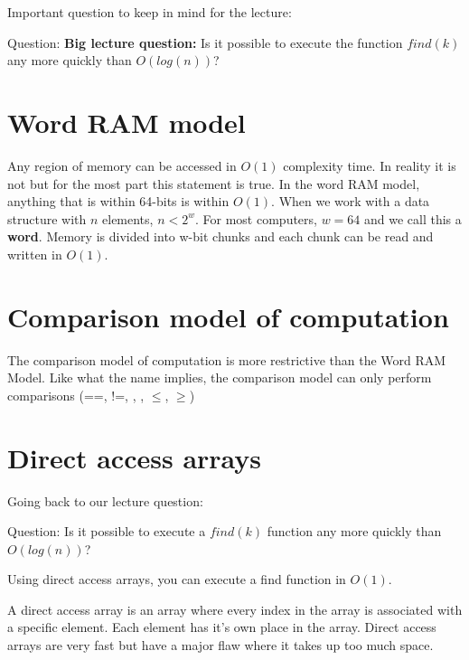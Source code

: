 \documentclass[11pt,a4paper,english]{report}
\begin{document}
Important question to keep in mind for the lecture:
\noindent 

\bigskip
\begin{gbox}{Question:}{
\noindent \textbf{Big lecture question:} Is it possible to execute the function $find(k)$ any more quickly than $O(log(n))$?
}\end{gbox}

\section{Word RAM model}

Any region of memory can be accessed in $O(1)$ complexity time. In reality it is not but for the most part this statement is true. In the word RAM model, anything that is within 64-bits is within $O(1)$. When we work with a data structure with $n$ elements, $n < 2^{w}$. For most computers, $w = 64$ and we call this a \textbf{word}. Memory is divided into w-bit chunks and each chunk can be read and written in $O(1)$.

\section{Comparison model of computation}

The comparison model of computation is more restrictive than the Word RAM Model. Like what the name implies, the comparison model can only perform comparisons (==, !=, , , $\leq$, $\geq$)

\section{Direct access arrays}

Going back to our lecture question: 

\bigskip
\begin{gbox}{Question:}{
    Is it possible to execute a $find(k)$ function any more quickly than $O(log(n))$?
}\end{gbox}
\bigskip

\noindent Using direct access arrays, you can execute a find function in $O(1)$.

\noindent A direct access array is an array where every index in the array is associated with a specific element. Each element has it's own place in the array. Direct access arrays are very fast but have a major flaw where it takes up too much space.
\end{document}

